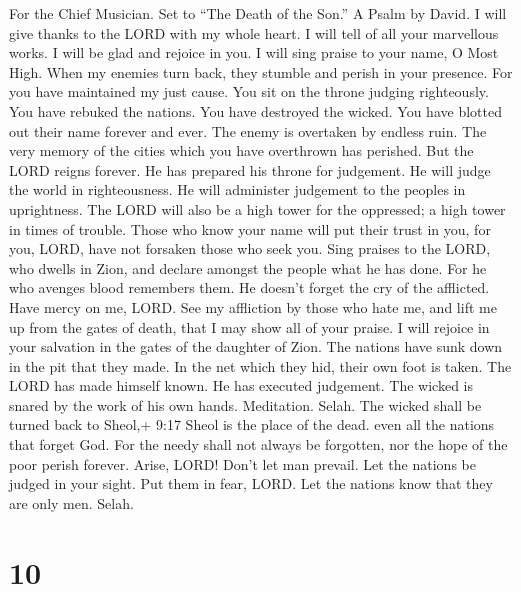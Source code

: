 For the Chief Musician. Set to ``The Death of the Son.'' A Psalm by
David.  I will give thanks to the LORD with my whole heart.
I will tell of all your marvellous works.  I will be glad
and rejoice in you. I will sing praise to your name, O Most High.
 When my enemies turn back, they stumble and perish in your
presence.  For you have maintained my just cause. You sit on
the throne judging righteously.  You have rebuked the
nations. You have destroyed the wicked. You have blotted out their name
forever and ever.  The enemy is overtaken by endless ruin.
The very memory of the cities which you have overthrown has perished.
 But the LORD reigns forever. He has prepared his throne for
judgement.  He will judge the world in righteousness. He
will administer judgement to the peoples in uprightness. 
The LORD will also be a high tower for the oppressed; a high tower in
times of trouble.  Those who know your name will put their
trust in you, for you, LORD, have not forsaken those who seek you.
 Sing praises to the LORD, who dwells in Zion, and declare
amongst the people what he has done.  For he who avenges
blood remembers them. He doesn't forget the cry of the afflicted.
 Have mercy on me, LORD. See my affliction by those who
hate me, and lift me up from the gates of death,  that I
may show all of your praise. I will rejoice in your salvation in the
gates of the daughter of Zion.  The nations have sunk down
in the pit that they made. In the net which they hid, their own foot is
taken.  The LORD has made himself known. He has executed
judgement. The wicked is snared by the work of his own hands.
Meditation. Selah.  The wicked shall be turned back to
Sheol,+ 9:17 Sheol is the place of the dead. even all the nations that
forget God.  For the needy shall not always be forgotten,
nor the hope of the poor perish forever.  Arise, LORD!
Don't let man prevail. Let the nations be judged in your sight.
 Put them in fear, LORD. Let the nations know that they are
only men. Selah.

\hypertarget{section-9}{%
\section{10}\label{section-9}}

